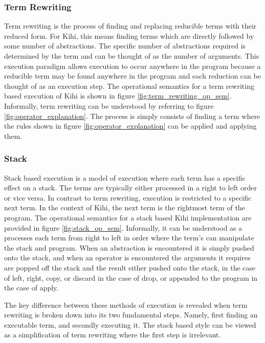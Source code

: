 \subsubsection{Term Rewriting}
Term rewriting is the process of finding
and replacing reducible terms with their reduced form. For Kihi,
this means finding terms which are directly followed by
some number of abstractions. The specific number of abstractions
required is determined by the term and can be thought of as the
number of arguments. This execution paradigm allows execution
to occur anywhere in the program because a reducible term may
be found anywhere in the program and each reduction can be
thought of as an execution step. The operational semantics for a term rewriting based execution of
Kihi is shown in figure \ref{fig:term_rewriting_op_sem}. Informally, term rewriting can be understood by referring to figure \ref{fig:operator_explanation}. The process is simply consists of finding a term where the rules shown in figure \ref{fig:operator_explanation} can be applied and applying them.


\subsubsection{Stack}
Stack based execution is a model of execution where each term has a specific effect on a stack. The terms are typically either processed in a right to left order or vice versa. In contrast to term rewriting, execution is restricted to a specific next term. In the context of Kihi, the next term is the rightmost term of the program. The operational semantics for a stack based Kihi implementation are provided in figure \ref{fig:stack_op_sem}. Informally, it can be understood as a processes each term from right to left in order where the term's can manipulate the stack and program. When an abstraction is encountered it is simply pushed onto the stack, and when an operator is encountered the arguments it requires are popped off the stack and the result either pushed onto the stack, in the case of left, right, copy, or discard in the case of drop, or appended to the program in the case of apply.




The key difference between these methods of execution is
revealed when term rewriting is broken down into its two fundamental steps. Namely, first finding an executable term, and secondly executing it. The stack based style can be viewed as a simplification of term rewriting where the first step is irrelevant.

